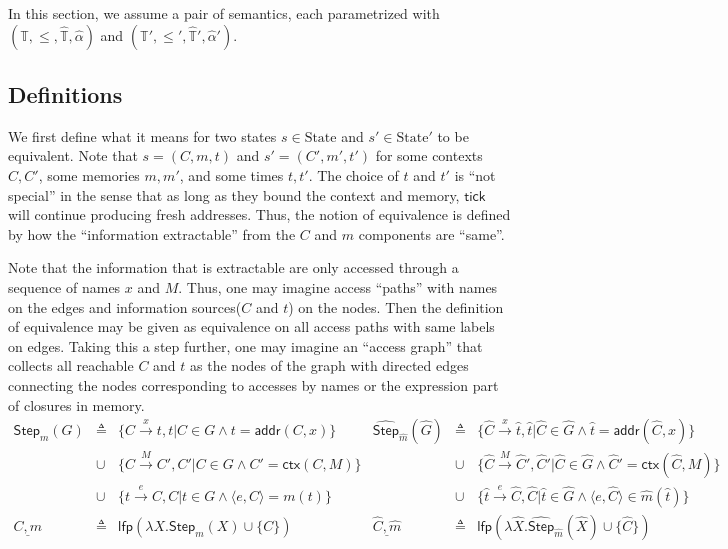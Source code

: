 \documentclass{article}
\theoremstyle{definition}
\newcommand*{\A}[1]{\widehat{#1}}
\newcommand*{\Time}{\mathbb{T}}
\newcommand*{\ATime}{\A{\Time}}
\newcommand*{\mem}{m}
\newcommand*{\State}{\text{State}}
\newcommand*{\addr}{\mathsf{addr}}
\newcommand*{\tick}{\mathsf{tick}}
\newcommand*{\modctx}{\mathsf{ctx}}
\begin{document}
In this section, we assume a pair of semantics, each parametrized with $(\Time,\le,\ATime,\A\alpha)$ and $(\Time',\le',\ATime',\A\alpha')$.

\subsection{Definitions}
We first define what it means for two states $s\in\State$ and $s'\in\State'$ to be equivalent.
Note that $s=(C,\mem,t)$ and $s'=(C',\mem',t')$ for some contexts $C,C'$, some memories $\mem,\mem'$, and some times $t,t'$.
The choice of $t$ and $t'$ is ``not special'' in the sense that as long as they bound the context and memory, $\tick$ will continue producing fresh addresses.
Thus, the notion of equivalence is defined by how the ``information extractable'' from the $C$ and $\mem$ components are ``same''.

Note that the information that is extractable are only accessed through a sequence of names $x$ and $M$.
Thus, one may imagine access ``paths'' with names on the edges and information sources($C$ and $t$) on the nodes.
Then the definition of equivalence may be given as equivalence on all access paths with same labels on edges.
Taking this a step further, one may imagine an ``access graph'' that collects all reachable $C$ and $t$ as the nodes of the graph with directed edges connecting the nodes corresponding to accesses by names or the expression part of closures in memory.
\[
  \begin{array}{rclrcl}
    \mathsf{Step}_m(G) & \triangleq & \{C\xrightarrow{x}t,t|C\in G\wedge t=\addr(C,x)\}             & \A{\mathsf{Step}}_{\A{m}}(\A{G}) & \triangleq & \{\A{C}\xrightarrow{x}\A{t},\A{t}|\A{C}\in \A{G}\wedge \A{t}=\addr(\A{C},x)\}                   \\
                       & \cup       & \{C\xrightarrow{M}C',C'|C\in G\wedge C'=\modctx(C,M)\}        &                                  & \cup       & \{\A{C}\xrightarrow{M}\A{C}',\A{C}'|\A{C}\in \A{G}\wedge \A{C}'=\modctx(\A{C},M)\}              \\
                       & \cup       & \{t\xrightarrow{e}C,C|t\in G\wedge \langle e,C \rangle=m(t)\} &                                  & \cup       & \{\A{t}\xrightarrow{e}\A{C},\A{C}|\A{t}\in \A{G}\wedge \langle e,\A{C} \rangle\in\A{m}(\A{t})\} \\
    \underline{C,m}    & \triangleq & \mathsf{lfp}(\lambda X.\mathsf{Step}_m(X)\cup\{C\})           & \underline{\A{C},\A{m}}          & \triangleq & \mathsf{lfp}(\lambda \A{X}.\A{\mathsf{Step}}_{\A{m}}(\A{X})\cup\{\A{C}\})
  \end{array}
\]
\end{document}
